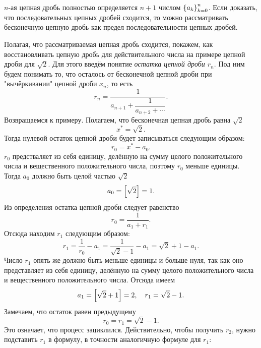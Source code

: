 \documentclass[12pt]{article}
\begin{document}
$n$\--ая цепная дробь полностью определяется $n+1$ числом $\qty{a_k}_{k=0}^n$. Если доказать, что последовательных цепных дробей сходится, то можно рассматривать бесконечную цепную дробь как предел последовательности цепных дробей.
\par
Полагая, что рассматриваемая цепная дробь сходится, покажем, как восстановливать цепную дробь для действительного числа на примере цепной дроби для $\sqrt{2}$. Для этого введём понятие \emph{остатка цепной дроби $r_n$}. Под ним будем понимать то, что осталось от бесконечной цепной дроби при "вычёркивании"{} цепной дроби $x_n$, то есть
\begin{equation}
    r_n =\dfrac{1}{a_{n+1} + \dfrac{1}{a_{n+2} + \cdots}}.
\end{equation}
Возвращаемся к примеру. Полагаем, что бесконечная цепная дробь равна $\sqrt{2}$
\begin{equation}
    x^* = \sqrt{2}.
\end{equation}
Тогда нулевой остаток цепной дроби будет записываться следующим образом:
\begin{equation}
    r_0 = x^* - a_0.
\end{equation}
$r_0$ предстваляет из себя единицу, делённую на сумму целого положительного числа и вещественного положительного числа, поэтому $r_0$ меньше единицы. Тогда $a_0$ должно быть целой частью $\sqrt{2}$
\begin{equation}
    a_0 = \qty[\sqrt{2}] = 1.
\end{equation}
Из определения остатка цепной дроби следует равенство
\begin{equation}
    r_0 = \dfrac{1}{a_1 + r_1}.
\end{equation}
Отсюда находим $r_1$ следующим образом:
\begin{equation}
    r_1 = \dfrac{1}{r_0} - a_1  = \dfrac{1}{\sqrt{2} - 1} -  a_1 = \sqrt{2} + 1 - a_1.
\end{equation}
Число $r_1$ опять же должно быть меньше единицы и больше нуля, так как оно представляет из себя единицу, делённую на сумму целого положительного числа и вещественного положительного числа. Отсюда имеем
\begin{equation}
    a_1 = \qty[\sqrt{2}+1] = 2, \quad r_1 = \sqrt{2} - 1.
\end{equation}
Замечаем, что остаток равен предыдущему
\begin{equation}
    r_0 = r_1 = \sqrt{2} - 1.
\end{equation}
Это означает, что процесс зациклился. Действительно, чтобы получить $r_2$, нужно подставить $r_1$ в формулу, в точности аналогичную формуле для $r_1$:
\end{document}

